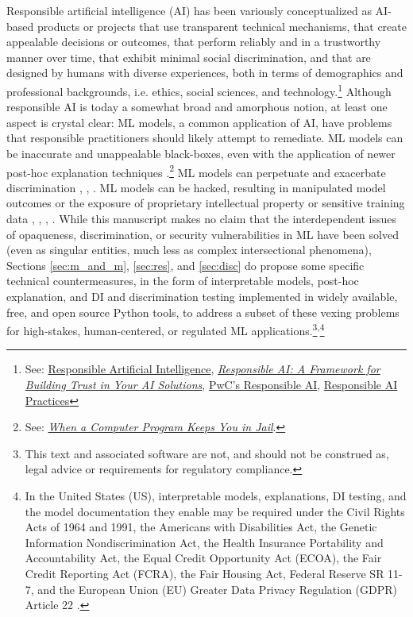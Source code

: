 \documentclass[information,article,submit,moreauthors,pdftex]{definitions/mdpi}
\begin{document}
Responsible artificial intelligence (AI) has been variously conceptualized as AI-based products or projects that use transparent technical mechanisms, that create appealable decisions or outcomes, that perform reliably and in a trustworthy manner over time, that exhibit minimal social discrimination, and that are designed by humans with diverse experiences, both in terms of demographics and professional backgrounds, i.e. ethics, social sciences, and technology.\footnote{See: \href{https://ec.europa.eu/jrc/communities/sites/jrccties/files/03_dignum_v.pdf}{Responsible Artificial Intelligence}, \href{https://www.accenture.com/_acnmedia/pdf-92/accenture-afs-responsible-ai.pdf}{\textit{Responsible AI: A Framework for Building Trust in Your AI Solutions}}, \href{https://www.pwc.com/us/en/services/consulting/analytics/artificial-intelligence/what-is-responsible-ai.html}{PwC's Responsible AI}, \href{https://ai.google/responsibilities/responsible-ai-practices/}{Responsible AI Practices}} Although responsible AI is today a somewhat broad and amorphous notion, at least one aspect is crystal clear: ML models, a common application of AI, have problems that responsible practitioners should likely attempt to remediate. ML models can be inaccurate and unappealable black-boxes, even with the application of newer post-hoc explanation techniques \cite{please_stop}.\footnote{See: \href{https://www.nytimes.com/2017/06/13/opinion/how-computers-are-harming-criminal-justice.html}{\textit{When a Computer Program Keeps You in Jail}}.} ML models can perpetuate and exacerbate discrimination \cite{feldman2015certifying}, \cite{dwork2012fairness}, \cite{gender_shades}.  ML models can be hacked, resulting in manipulated model outcomes or the exposure of proprietary intellectual property or sensitive training data \cite{security_of_ml}, \cite{model_stealing}, \cite{membership_inference}, \cite{shokri2019privacy}. While this manuscript makes no claim that the interdependent issues of opaqueness, discrimination, or security vulnerabilities in ML have been solved (even as singular entities, much less as complex intersectional phenomena), Sections \ref{sec:m_and_m}, \ref{sec:res}, and \ref{sec:disc} do propose some specific technical countermeasures, in the form of interpretable models, post-hoc explanation, and DI and discrimination testing implemented in widely available, free, and open source Python tools, to address a subset of these vexing problems for high-stakes, human-centered, or regulated ML applications.\footnote{This text and associated software are not, and should not be construed as, legal advice or requirements for regulatory compliance.}\textsuperscript{,}\footnote{In the United States (US), interpretable models, explanations, DI testing, and the model documentation they enable may be required under the Civil Rights Acts of 1964 and 1991, the Americans with Disabilities Act, the Genetic Information Nondiscrimination Act, the Health Insurance Portability and Accountability Act, the Equal Credit Opportunity Act (ECOA), the Fair Credit Reporting Act (FCRA), the Fair Housing Act, Federal Reserve SR 11-7, and the European Union (EU) Greater Data Privacy Regulation (GDPR) Article 22 \cite{ff_interpretability}.}
\end{document}
